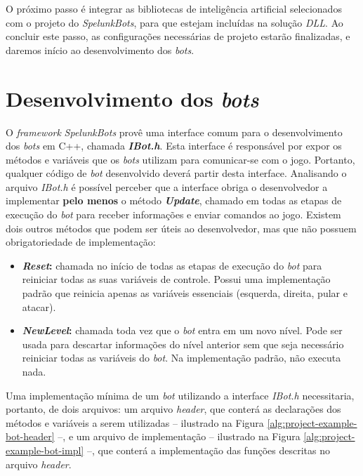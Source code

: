 O próximo passo é integrar as bibliotecas de inteligência artificial
selecionados com o projeto do \textit{SpelunkBots}, para que estejam incluídas
na solução \textit{DLL}. Ao concluir este passo, as configurações necessárias de
projeto estarão finalizadas, e daremos início ao desenvolvimento dos
\textit{bots}.


\section{Desenvolvimento dos \textit{bots}}
O \textit{framework} \textit{SpelunkBots} provê uma interface comum para o
desenvolvimento dos \textit{bots} em C++, chamada \textbf{\textit{IBot.h}}. Esta
interface é responsável por expor os métodos e variáveis que os \textit{bots}
utilizam para comunicar-se com o jogo. Portanto, qualquer código de \textit{bot}
desenvolvido deverá partir desta interface. Analisando o arquivo \textit{IBot.h}
é possível perceber que a interface obriga o desenvolvedor a implementar
\textbf{pelo menos} o método \textbf{\textit{Update}}, chamado em todas as
etapas de execução do \textit{bot} para receber informações e enviar comandos ao
jogo. Existem dois outros métodos que podem ser úteis ao desenvolvedor, mas que
não possuem obrigatoriedade de implementação:

\begin{itemize}
	\item
		\textbf{\textit{Reset}:} chamada no início de todas as etapas de
		execução do \textit{bot} para reiniciar todas as suas variáveis de
		controle. Possui uma implementação padrão que reinicia apenas as
		variáveis essenciais (esquerda, direita, pular e atacar).

	\item
		\textbf{\textit{NewLevel}:} chamada toda vez que o \textit{bot} entra em
		um novo nível. Pode ser usada para descartar informações do nível
		anterior sem que seja necessário reiniciar todas as variáveis do
		\textit{bot}. Na implementação padrão, não executa nada.
\end{itemize}

Uma implementação mínima de um \textit{bot} utilizando a interface
\textit{IBot.h} necessitaria, portanto, de dois arquivos: um arquivo
\textit{header}, que conterá as declarações dos métodos e variáveis a serem
utilizadas -- ilustrado na Figura \ref{alg:project-example-bot-header} --, e
um arquivo de implementação -- ilustrado na Figura
\ref{alg:project-example-bot-impl} --, que conterá a implementação das funções
descritas no arquivo \textit{header}.

